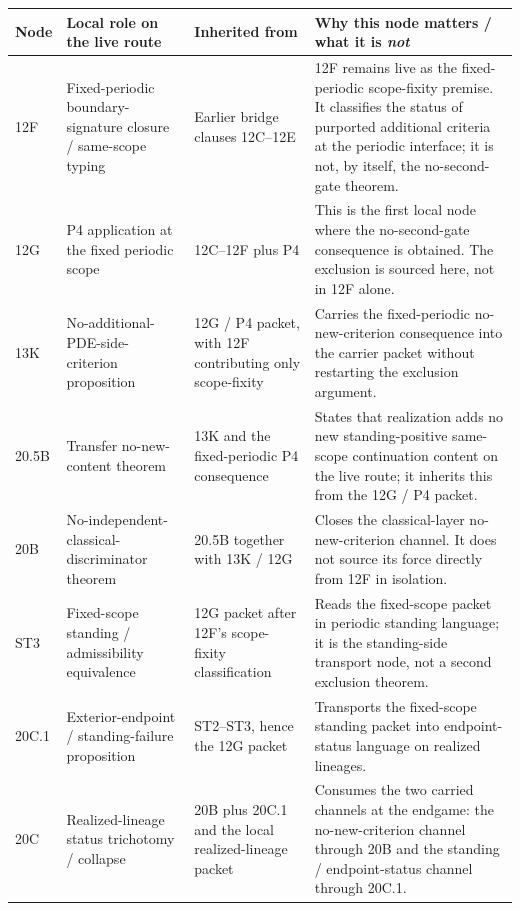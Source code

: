 \begin{center}
\footnotesize
\renewcommand{\arraystretch}{1.16}
\setlength{\tabcolsep}{4pt}
\begin{tabularx}{0.98\textwidth}{@{}L{0.15\textwidth}L{0.23\textwidth}L{0.21\textwidth}Y@{}}
\toprule
\textbf{Node} & \textbf{Local role on the live route} & \textbf{Inherited from} & \textbf{Why this node matters / what it is \emph{not}}\\
\midrule
12F & Fixed-periodic boundary-signature closure / same-scope typing & Earlier bridge clauses 12C--12E & 12F remains live as the fixed-periodic scope-fixity premise. It classifies the status of purported additional criteria at the periodic interface; it is not, by itself, the no-second-gate theorem.\\
12G & P4 application at the fixed periodic scope & 12C--12F plus P4 & This is the first local node where the no-second-gate consequence is obtained. The exclusion is sourced here, not in 12F alone.\\
13K & No-additional-PDE-side-criterion proposition & 12G / P4 packet, with 12F contributing only scope-fixity & Carries the fixed-periodic no-new-criterion consequence into the carrier packet without restarting the exclusion argument.\\
20.5B & Transfer no-new-content theorem & 13K and the fixed-periodic P4 consequence & States that realization adds no new standing-positive same-scope continuation content on the live route; it inherits this from the 12G / P4 packet.\\
20B & No-independent-classical-discriminator theorem & 20.5B together with 13K / 12G & Closes the classical-layer no-new-criterion channel. It does not source its force directly from 12F in isolation.\\
ST3 & Fixed-scope standing / admissibility equivalence & 12G packet after 12F's scope-fixity classification & Reads the fixed-scope packet in periodic standing language; it is the standing-side transport node, not a second exclusion theorem.\\
20C.1 & Exterior-endpoint / standing-failure proposition & ST2--ST3, hence the 12G packet & Transports the fixed-scope standing packet into endpoint-status language on realized lineages.\\
20C & Realized-lineage status trichotomy / collapse & 20B plus 20C.1 and the local realized-lineage packet & Consumes the two carried channels at the endgame: the no-new-criterion channel through 20B and the standing / endpoint-status channel through 20C.1.\\
\bottomrule
\end{tabularx}
\end{center}

